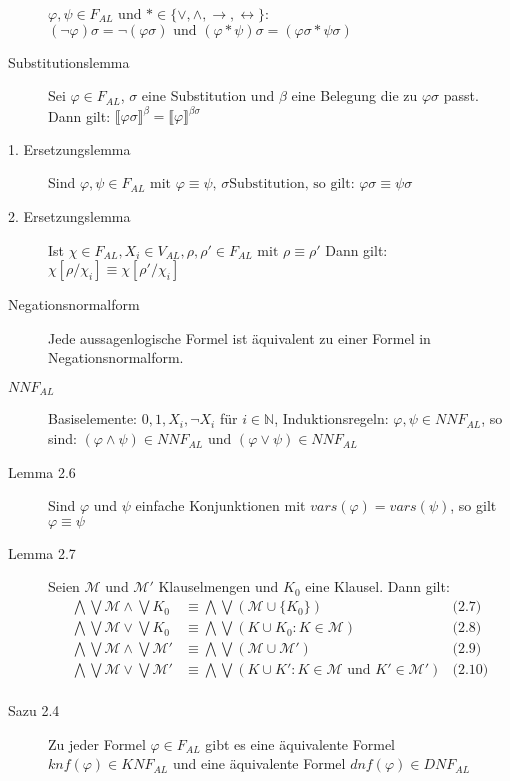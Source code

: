 \documentclass[12pt,a4paper]{scrartcl}
\begin{document}
\begin{description}
            $\varphi, \psi \in F_{AL} \text{ und } * \in \{\vee, \wedge, \rightarrow, \leftrightarrow\} $: $(\neg \varphi)\sigma = \neg(\varphi \sigma) \text{ und } (\varphi * \psi)\sigma = (\varphi \sigma * \psi \sigma)$
    \item[Substitutionslemma] Sei $\varphi \in F_{AL}$, $\sigma$ eine Substitution und $\beta$ eine Belegung die zu $\varphi \sigma$ passt. Dann gilt: 
            $\llbracket \varphi \sigma \rrbracket^{\beta} = \llbracket \varphi \rrbracket^{\beta \sigma}$
    \item[1. Ersetzungslemma] Sind $\varphi, \psi \in F_{AL} \text{ mit } \varphi \equiv \psi \text{, } \sigma \text{Substitution, so gilt: } \varphi \sigma \equiv \psi \sigma$
    \item[2. Ersetzungslemma] Ist $\chi \in F_{AL}, X_i \in V_{AL}, \rho, \rho' \in F_{AL} \text{ mit } \rho \equiv \rho'$ Dann gilt: $\chi[\rho/\chi_i] \equiv \chi[\rho'/\chi_i]$
    \item[Negationsnormalform] Jede aussagenlogische Formel ist äquivalent zu einer Formel in Negationsnormalform.
    \item[$NNF_{AL}$] Basiselemente: $0, 1, X_i, \neg X_i$ für $i \in \mathbb{N}$, Induktionsregeln: $\varphi, \psi \in NNF_{AL} $, so sind: $(\varphi \wedge \psi) \in NNF_{AL} \text{ und } (\varphi \vee \psi) \in NNF_{AL}$
    \item[Lemma 2.6] Sind $\varphi$ und $\psi$ einfache Konjunktionen mit $vars(\varphi) = vars(\psi)$, so gilt $\varphi \equiv \psi$
    \item[Lemma 2.7] Seien $\mathcal{M}$ und $\mathcal{M}'$ Klauselmengen und $K_0$ eine Klausel. Dann gilt:\\
            \begin{align*}
              \bigwedge \bigvee \mathcal{M} \wedge \bigvee K_0 &\equiv \bigwedge \bigvee(\mathcal{M} \cup \{ K_0 \}) & \text{(2.7)}\\
              \bigwedge \bigvee \mathcal{M} \vee \bigvee K_0 &\equiv \bigwedge \bigvee(K \cup K_0 : K \in \mathcal{M}) & \text{(2.8)}\\
              \bigwedge \bigvee \mathcal{M} \wedge \bigvee \mathcal{M}' &\equiv \bigwedge \bigvee(\mathcal{M} \cup \mathcal{M}') & \text{(2.9)}\\
              \bigwedge \bigvee \mathcal{M} \vee \bigvee \mathcal{M}' &\equiv \bigwedge \bigvee(K \cup K' : K \in \mathcal{M} \text{ und } K' \in \mathcal{M}') & \text{(2.10)}\\
            \end{align*}
    \item[Sazu 2.4] Zu jeder Formel $\varphi \in F_{AL}$ gibt es eine äquivalente Formel $knf(\varphi) \in KNF_{AL}$ und eine äquivalente Formel $dnf(\varphi) \in DNF_{AL}$
  \end{description}
\end{document}
